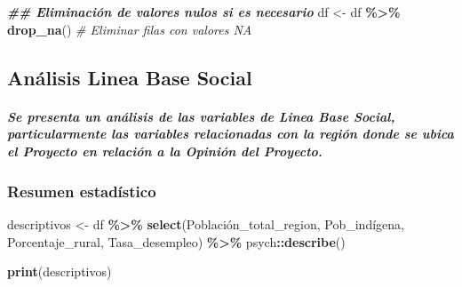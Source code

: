 \documentclass[
]{article}
\newenvironment{Shaded}{\begin{snugshade}}{\end{snugshade}}
\newcommand{\CommentTok}[1]{\textcolor[rgb]{0.56,0.35,0.01}{\textit{#1}}}
\newcommand{\DocumentationTok}[1]{\textcolor[rgb]{0.56,0.35,0.01}{\textbf{\textit{#1}}}}
\newcommand{\FunctionTok}[1]{\textcolor[rgb]{0.13,0.29,0.53}{\textbf{#1}}}
\newcommand{\NormalTok}[1]{#1}
\newcommand{\OtherTok}[1]{\textcolor[rgb]{0.56,0.35,0.01}{#1}}
\newcommand{\SpecialCharTok}[1]{\textcolor[rgb]{0.81,0.36,0.00}{\textbf{#1}}}
\begin{document}
\begin{Shaded}
\begin{Highlighting}[]
\DocumentationTok{\#\# Eliminación de valores nulos si es necesario}
\NormalTok{df }\OtherTok{\textless{}{-}}\NormalTok{ df }\SpecialCharTok{\%\textgreater{}\%} \FunctionTok{drop\_na}\NormalTok{()  }\CommentTok{\# Eliminar filas con valores NA }
\end{Highlighting}
\end{Shaded}

\subsection{\texorpdfstring{\textbf{Análisis Linea Base
Social}}{Análisis Linea Base Social}}\label{anuxe1lisis-linea-base-social}

\subparagraph{\texorpdfstring{\emph{Se presenta un análisis de las
variables de Linea Base Social, particularmente las variables
relacionadas con la región donde se ubica el Proyecto en relación a la
Opinión del
Proyecto.}}{Se presenta un análisis de las variables de Linea Base Social, particularmente las variables relacionadas con la región donde se ubica el Proyecto en relación a la Opinión del Proyecto.}}\label{se-presenta-un-anuxe1lisis-de-las-variables-de-linea-base-social-particularmente-las-variables-relacionadas-con-la-regiuxf3n-donde-se-ubica-el-proyecto-en-relaciuxf3n-a-la-opiniuxf3n-del-proyecto.}

\subsubsection{\texorpdfstring{\textbf{Resumen
estadístico}}{Resumen estadístico}}\label{resumen-estaduxedstico}

\begin{Shaded}
\begin{Highlighting}[]
\NormalTok{descriptivos }\OtherTok{\textless{}{-}}\NormalTok{ df }\SpecialCharTok{\%\textgreater{}\%}
  \FunctionTok{select}\NormalTok{(Población\_total\_region, Pob\_indígena, Porcentaje\_rural, Tasa\_desempleo) }\SpecialCharTok{\%\textgreater{}\%}
\NormalTok{  psych}\SpecialCharTok{::}\FunctionTok{describe}\NormalTok{()}
  
\FunctionTok{print}\NormalTok{(descriptivos) }
\end{Highlighting}
\end{Shaded}
\end{document}
